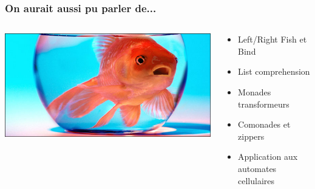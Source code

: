 \documentclass{beamer}
\begin{document}
\begin{frame}[fragile]
  \frametitle{On aurait aussi pu parler de...}
\begin{columns}[T]
  \begin{column}{0.5\textwidth}
    \includegraphics[scale=0.3]{goldfish}
  \end{column}
  \begin{column}{0.5\textwidth}
    \begin{itemize}
      \item Left/Right Fish et Bind
      \item List comprehension
      \item Monades transformeurs
      \item Comonades et zippers
      \item Application aux automates cellulaires
    \end{itemize}
  \end{column}
\end{columns}
\end{frame}
\end{document}
